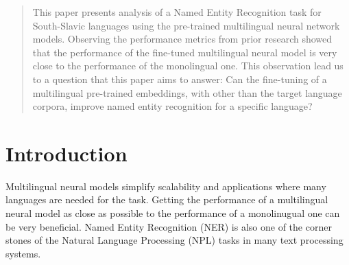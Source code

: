 \documentclass[sigconf]{acmart}
\begin{document}
\renewcommand{\shortauthors}{Ivačič et al.}

\begin{abstract}
  This paper presents analysis of a Named Entity Recognition task for South-Slavic languages using the pre-trained multilingual neural network models.
  Observing the performance metrics from prior research showed that the performance of the fine-tuned multilingual neural model is very close to the performance of the monolingual one.
  This observation lead us to a question that this paper aims to answer: Can the fine-tuning of a multilingual pre-trained embeddings, with other than the target language corpora, improve named entity recognition for a specific language?
\end{abstract}



\maketitle

\section{Introduction}
\label{sec:introduction}
Multilingual neural models simplify scalability and applications where many languages are needed for the task.
Getting the performance of a multilingual neural model as close as possible to the performance of a monolinugual one can be very beneficial.
Named Entity Recognition (NER) is also one of the corner stones of the Natural Language Processing (NPL) tasks in many text processing systems.
\end{document}
